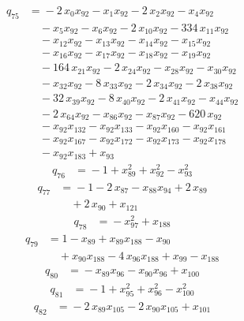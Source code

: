 \documentclass[11pt]{article}
\theoremstyle{remark}\newtheorem{remark}[theorem]{Remark}
\begin{document}
\begin{align*}
q_{75} &={}-2\,x_{0}x_{92} -x_{1}x_{92} -2\,x_{2}x_{92} -x_{4}x_{92}\\
&\quad -x_{5}x_{92} -x_{6}x_{92} -2\,x_{10}x_{92} -334\,x_{11}x_{92}\\
&\quad -x_{12}x_{92} -x_{13}x_{92} -x_{14}x_{92} -x_{15}x_{92}\\
&\quad -x_{16}x_{92} -x_{17}x_{92} -x_{18}x_{92} -x_{19}x_{92}\\
&\quad -164\,x_{21}x_{92} -2\,x_{24}x_{92} -x_{28}x_{92} -x_{30}x_{92}\\
&\quad -x_{32}x_{92} -8\,x_{33}x_{92} -2\,x_{34}x_{92} -2\,x_{38}x_{92}\\
&\quad -32\,x_{39}x_{92} -8\,x_{40}x_{92} -2\,x_{41}x_{92} -x_{44}x_{92}\\
&\quad -2\,x_{64}x_{92} -x_{86}x_{92} -x_{87}x_{92} -620\,x_{92}\\
&\quad -x_{92}x_{132} -x_{92}x_{133} -x_{92}x_{160} -x_{92}x_{161}\\
&\quad -x_{92}x_{167} -x_{92}x_{172} -x_{92}x_{173} -x_{92}x_{178}\\
&\quad -x_{92}x_{183} +x_{93}
\end{align*}
\begin{align*}
q_{76} &={}-1 +x_{89}^{2} +x_{92}^{2} -x_{93}^{2}
\end{align*}
\begin{align*}
q_{77} &={}-1 -2\,x_{87} -x_{88}x_{94} +2\,x_{89}\\
&\quad +2\,x_{90} +x_{121}
\end{align*}
\begin{align*}
q_{78} &={}-x_{97}^{2} +x_{188}
\end{align*}
\begin{align*}
q_{79} &={}1 -x_{89} +x_{89}x_{188} -x_{90}\\
&\quad +x_{90}x_{188} -4\,x_{96}x_{188} +x_{99} -x_{188}
\end{align*}
\begin{align*}
q_{80} &={}-x_{89}x_{96} -x_{90}x_{96} +x_{100}
\end{align*}
\begin{align*}
q_{81} &={}-1 +x_{95}^{2} +x_{96}^{2} -x_{100}^{2}
\end{align*}
\begin{align*}
q_{82} &={}-2\,x_{89}x_{105} -2\,x_{90}x_{105} +x_{101}
\end{align*}
\end{document}
